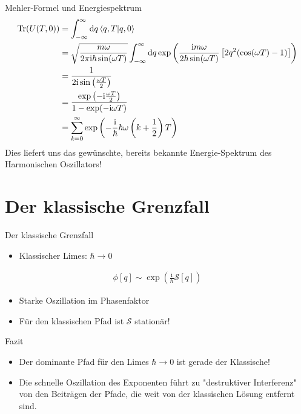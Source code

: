\begin{frame}{Mehler-Formel und Energiespektrum}
\begin{align*}
\operatorname{Tr}(U(T,0)) &= \int_{-\infty}^{\infty} \dd q \braket{q,T}{q,0}	\\
&=  \sqrt{\frac{m\omega}{2\pi\mathrm{i}\hbar\sin(\omega T)}} \int_{-\infty}^{\infty} \dd q  \exp\left(\frac{\mathrm{i}m\omega}{2\hbar\sin(\omega T)}\left[2q^2(\cos(\omega T)- 1)\right] \right) \\
&= \frac{1}{2\mathrm{i}\sin\left(\frac{\omega T}{2}\right)} \\
&= \frac{\exp\left(-\mathrm{i}\frac{\omega T}{2}\right)}{1-\exp(-\mathrm{i}\omega T)}	\\
&= \sum_{k=0}^{\infty} \exp\left(-\frac{\mathrm{i}}{\hbar}\hbar\omega\left(k+\frac{1}{2}\right)T\right)
\end{align*}
Dies liefert uns das gewünschte, bereits bekannte Energie-Spektrum des Harmonischen Oszillators!

\end{frame}


\section{Der klassische Grenzfall}
\begin{frame}{Der klassische Grenzfall}

\begin{itemize}
	\item Klassischer Limes: $\hbar \rightarrow 0$
\end{itemize}
\begin{align*}
	\phi[q] \sim \exp(\frac{\mathrm{i}}{\hbar} \mathcal{S}[q])
\end{align*}
\begin{itemize}
	\item Starke Oszillation im Phasenfaktor
	\item Für den klassischen Pfad ist $\mathcal{S}$ stationär!
\end{itemize} 
\begin{block}{\hfill Fazit \hfill}
\begin{itemize}
	\item Der dominante Pfad für den Limes $\hbar\rightarrow 0$ ist gerade der Klassische!
	\item  Die schnelle Oszillation des Exponenten führt zu "destruktiver Interferenz" von den Beiträgen der Pfade, die weit von der klassischen Lösung entfernt sind.	
\end{itemize}
\end{block}

\end{frame}

